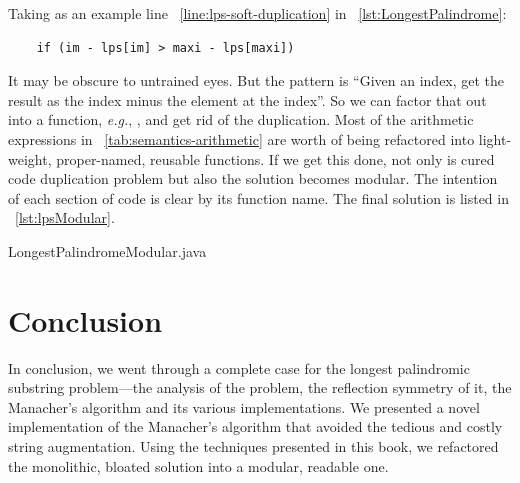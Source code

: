 Taking as an example line ~\autoref{line:lps-soft-duplication} in ~\autoref{lst:LongestPalindrome}:
\begin{lstlisting}
    if (im - lps[im] > maxi - lps[maxi])
\end{lstlisting}
It may be obscure to untrained eyes.
But the pattern is ``Given an index, get the result as the index minus the element
at the index''.
So we can factor that out into a function, \textit{e.g.}, , and get rid of the
duplication.
Most of the arithmetic expressions in ~\autoref{tab:semantics-arithmetic} are worth of being
refactored into light-weight, proper-named, reusable functions.
If we get this done, not only is cured code duplication problem but also the solution becomes
modular.
The intention of each section of code is clear by its function name.
The final solution is listed in ~\autoref{lst:lpsModular}.


{LongestPalindromeModular.java}


\section{Conclusion}\label{sec:conclusion}

In conclusion, we went through a complete case for the longest palindromic substring
problem---the analysis of the problem, the reflection symmetry of it, the Manacher's algorithm
and its various implementations.
We presented a novel implementation of the Manacher's algorithm that avoided the tedious and costly
string augmentation.
Using the techniques presented in this book, we refactored the monolithic, bloated solution
into a modular, readable one.
